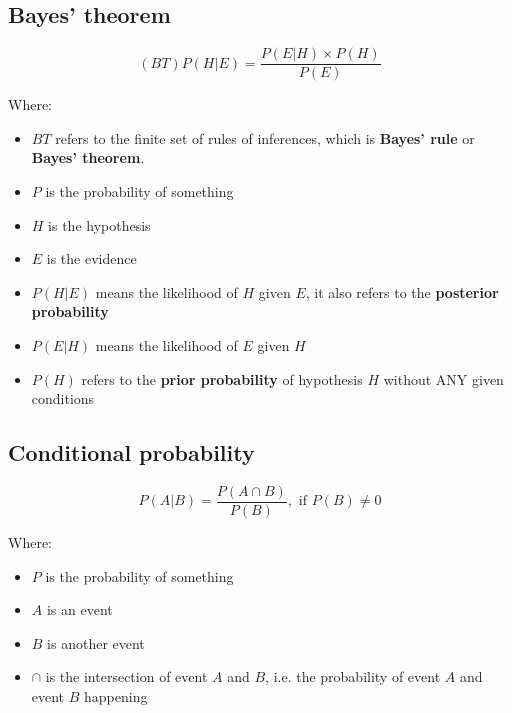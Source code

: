\documentclass[11pt]{article}
\begin{document}
\subsection{Bayes' theorem}
\label{sec:org0b14831}
\[(BT) P(H | E) = \frac{P(E | H) \times P(H)}{P(E)}\]

Where:
\begin{itemize}
\item \(BT\) refers to the finite set of rules of inferences, which is \textbf{Bayes' rule} or \textbf{Bayes' theorem}.
\item \(P\) is the probability of something
\item \(H\) is the hypothesis
\item \(E\) is the evidence
\item \(P(H | E)\) means the likelihood of \(H\) given \(E\), it also refers to the \textbf{posterior probability}
\item \(P(E | H)\) means the likelihood of \(E\) given \(H\)
\item \(P(H)\) refers to the \textbf{prior probability} of hypothesis \(H\) without ANY given conditions
\end{itemize}
\subsection{Conditional probability}
\label{sec:orgcbae45a}
\[P(A | B) = \frac{P (A \cap B)}{P(B)}, \text{ if } P(B) \ne 0\]

Where:
\begin{itemize}
\item \(P\) is the probability of something
\item \(A\) is an event
\item \(B\) is another event
\item \(\cap\) is the intersection of event \(A\) and \(B\), i.e. the probability of event \(A\) and event \(B\) happening
\end{itemize}
\end{document}
